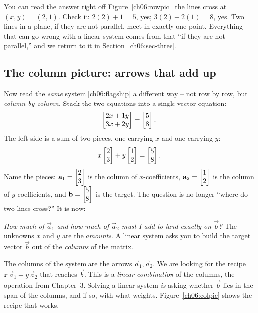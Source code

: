 You can read the answer right off Figure~\ref{ch06:rowpic}: the lines cross
at $(x,y)=(2,1)$. Check it: $2(2)+1=5$, yes; $3(2)+2(1)=8$, yes. Two lines in
a plane, if they are not parallel, meet in exactly one point. Everything that
can go wrong with a linear system comes from that ``if they are not
parallel,'' and we return to it in Section~\ref{ch06:sec-three}.

\subsection{The column picture: arrows that add up}

Now read the \emph{same} system \eqref{ch06:flagship} a different way -- not
row by row, but \emph{column by column}. Stack the two equations
into a single vector equation:
\[
  \begin{bmatrix}2x+1y\\3x+2y\end{bmatrix} = \begin{bmatrix}5\\8\end{bmatrix}.
\]
The left side is a sum of two pieces, one carrying $x$ and one carrying $y$:
\[
  x\begin{bmatrix}2\\3\end{bmatrix} + y\begin{bmatrix}1\\2\end{bmatrix} = \begin{bmatrix}5\\8\end{bmatrix}.
\]
Name the pieces: $\mathbf{a}_1=\begin{bmatrix}2\\3\end{bmatrix}$ is the column of $x$-coefficients,
$\mathbf{a}_2=\begin{bmatrix}1\\2\end{bmatrix}$ is the column of $y$-coefficients, and
$\mathbf{b}=\begin{bmatrix}5\\8\end{bmatrix}$ is the target. The question is no longer ``where do
two lines cross?'' It is now:

\begin{focusbox}
\emph{How much of $\vec{a}_1$ and how much of $\vec{a}_2$ must I add to land
exactly on $\vec{b}$?} The unknowns $x$ and $y$ are the \emph{amounts}. A
linear system asks you to build the target vector $\vec b$ out of the
\emph{columns} of the matrix.
\end{focusbox}

The columns of the system are the arrows $\vec a_1,\vec a_2$. We are looking
for the recipe $x\,\vec a_1 + y\,\vec a_2$ that reaches $\vec b$. This is a
\emph{linear combination} of the columns, the operation from
Chapter~3. Solving a linear system \emph{is} asking whether $\vec b$ lies in
the span of the columns, and if so, with what weights.
Figure~\ref{ch06:colpic} shows the recipe that works.

